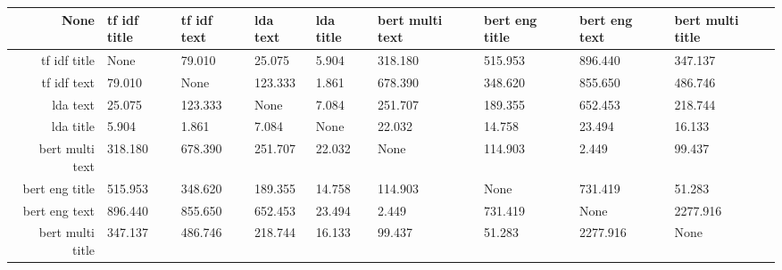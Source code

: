 \begin{tabular}{|r|l|l|l|l|l|l|l|l|}
  \hline
  None & tf idf title & tf idf text & lda text & lda title & bert multi text & bert eng title & bert eng text & bert multi title \\ 
  \hline
  tf idf title & None & 79.010 & 25.075 & 5.904 & 318.180 & 515.953 & 896.440 & 347.137 \\ 
  \hline
  tf idf text & 79.010 & None & 123.333 & 1.861 & 678.390 & 348.620 & 855.650 & 486.746 \\ 
  \hline
  lda text & 25.075 & 123.333 & None & 7.084 & 251.707 & 189.355 & 652.453 & 218.744 \\ 
  \hline
  lda title & 5.904 & 1.861 & 7.084 & None & 22.032 & 14.758 & 23.494 & 16.133 \\ 
  \hline
  bert multi text & 318.180 & 678.390 & 251.707 & 22.032 & None & 114.903 & 2.449 & 99.437 \\ 
  \hline
  bert eng title & 515.953 & 348.620 & 189.355 & 14.758 & 114.903 & None & 731.419 & 51.283 \\ 
  \hline
  bert eng text & 896.440 & 855.650 & 652.453 & 23.494 & 2.449 & 731.419 & None & 2277.916 \\ 
  \hline
  bert multi title & 347.137 & 486.746 & 218.744 & 16.133 & 99.437 & 51.283 & 2277.916 & None \\ 
  \hline
\end{tabular}
